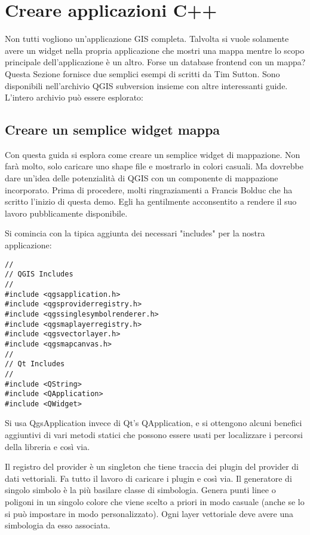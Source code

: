  \section{Creare applicazioni C++}

Non tutti vogliono un'applicazione GIS completa. Talvolta si vuole solamente avere un widget nella propria applicazione che mostri una mappa mentre lo scopo principale dell'applicazione è un altro. Forse un database frontend con un mappa? Questa Sezione fornisce due semplici esempi di scritti da Tim Sutton.
Sono disponibili nell'archivio QGIS subversion insieme con altre interessanti guide. L'intero archivio può essere esplorato: 

\subsection{Creare un semplice widget mappa}\label{subsec:simple_widget}

Con questa guida si esplora come creare un semplice widget di mappazione. Non farà molto, solo caricare uno shape file e mostrarlo in colori casuali. Ma dovrebbe dare un'idea delle potenzialità di QGIS con un componente di mappazione incorporato. Prima di procedere, molti ringraziamenti a Francis Bolduc che ha scritto l'inizio di questa demo. Egli ha gentilmente acconsentito a rendere il suo lavoro pubblicamente disponibile.

Si comincia con la tipica aggiunta dei necessari "includes" per la nostra applicazione:

\begin{verbatim}
//
// QGIS Includes
//
#include <qgsapplication.h>
#include <qgsproviderregistry.h>
#include <qgssinglesymbolrenderer.h>
#include <qgsmaplayerregistry.h>
#include <qgsvectorlayer.h>
#include <qgsmapcanvas.h>
//
// Qt Includes
//
#include <QString>
#include <QApplication>
#include <QWidget>
\end{verbatim}

Si usa QgsApplication invece di Qt's QApplication, e si ottengono alcuni benefici aggiuntivi di vari metodi statici che possono essere usati per localizzare i percorsi della libreria e così via.

Il registro del provider è un singleton che tiene traccia dei plugin del provider di dati vettoriali. Fa tutto il lavoro di caricare i plugin e così via. Il generatore di singolo simbolo è la più basilare classe di simbologia. Genera punti linee o poligoni in un singolo colore che viene scelto a priori in modo casuale (anche se lo si può impostare in modo personalizzato). Ogni layer vettoriale deve avere una simbologia da esso associata.


